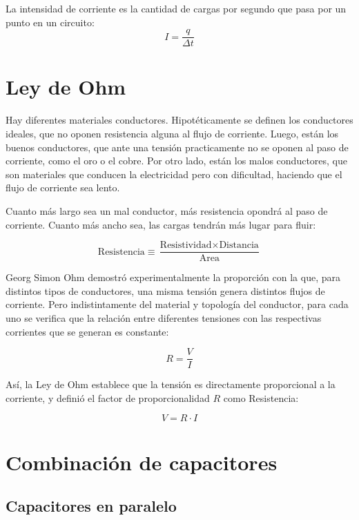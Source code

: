\documentclass[a5paper,12pt,twoside]{book}
\begin{document}
La intensidad de corriente es la cantidad de cargas por segundo que pasa por un punto en un circuito:
\begin{equation*}
    I = \frac{q}{\Delta t}
\end{equation*}


\section{Ley de Ohm}

Hay diferentes materiales conductores. Hipotéticamente se definen los conductores ideales, que no oponen resistencia alguna al flujo de corriente. Luego, están los buenos conductores, que ante una tensión practicamente no se oponen al paso de corriente, como el oro o el cobre. Por otro lado, están los malos conductores, que son materiales que conducen la electricidad pero con dificultad, haciendo que el flujo de corriente sea lento.

Cuanto más largo sea un mal conductor, más resistencia opondrá al paso de corriente. Cuanto más ancho sea, las cargas tendrán más lugar para fluir:

\begin{equation*}
    \text{Resistencia} \equiv \frac{\text{Resistividad} \times \text{Distancia}}{\text{Area}}
\end{equation*}

Georg Simon Ohm demostró experimentalmente la proporción con la que, para distintos tipos de conductores, una misma tensión genera distintos flujos de corriente. Pero indistintamente del material y topología del conductor, para cada uno se verifica que la relación entre diferentes tensiones con las respectivas corrientes que se generan es constante:

\begin{equation*}
    R = \frac{V}{I}
\end{equation*}

Así, la Ley de Ohm establece que la tensión es directamente proporcional a la corriente, y definió el factor de proporcionalidad $R$ como Resistencia:

\begin{equation}
    V = R \cdot I
\end{equation}


\section{Combinación de capacitores}


\subsection*{Capacitores en paralelo}
\end{document}
